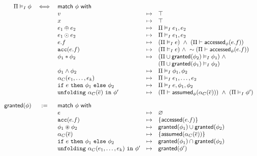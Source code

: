 \begin{align*}
\begin{array}{rclcl}
\Pi \frames \phi &\iff& \tsf{match} \ \phi \ \tsf{with} &&
\\
&& v &\mt&
  \top
\\
&& x &\mt&
  \top
\\
&& e_1 \oplus e_2 &\mt&
  \Pi \frames e_1, e_2
\\
&& e_1 \odot e_2 &\mt&
  \Pi \frames e_1, e_2
\\
&& e.f &\mt&
  (\Pi \frames e) \ \land \ (\Pi \entails \accessed_\phi(e.f))
\\
&& \cacc(e.f) &\mt&
  (\Pi \frames e)  \ \land \
  \pnot (\Pi \entails \accessed_\phi(e.f))
\\
&& \phi_1 \ast \phi_2 &\mt&
  (\Pi \cup \granted(\phi_2) \frames \phi_1) \ \land \\ &&&&
  (\Pi \cup \granted(\phi_1) \frames \phi_2)
\\
&& \phi_1 \land \phi_2 &\mt&
  \Pi \frames \phi_1, \phi_2
\\
&& \alpha_C(e_1, \dots, e_k) &\mt&
  \Pi \frames e_1, \dots, e_2
\\
&& \cif \ e \ \cthen \ \phi_1 \ \celse \ \phi_2 &\mt&
  \Pi \frames e, \phi_1, \phi_2
\\
&& \cunfolding \ \alpha_C(\vec{e}) \ \cin \ \phi\p &\mt&
  (\Pi \entails \assumed_\phi(\alpha_C(\vec{e}))) \ \land \
  (\Pi \frames \phi\p)
%
\\[1em]
%
\granted(\phi) &:=& \tsf{match} \ \phi \ \tsf{with} &&
\\
&& e &\mt&
  \empty
\\
&& \cacc(e.f) &\mt&
  \set{ \accessed(e.f) }
\\
&& \phi_1 \circast \phi_2 &\mt&
  \granted(\phi_1) \cup \granted(\phi_2)
\\
&& \alpha_C(\vec{e}) &\mt&
  \set{ \assumed(\alpha_C(\vec{e})) }
\\
&& \cif \ e \ \cthen \ \phi_1 \ \celse \ \phi_2 &\mt&
  \granted(\phi_1) \cap \granted(\phi_2)
\\
&& \cunfolding \ \alpha_C(e_1, \dots, e_k) \ \cin \ \phi\p &\mt&
  \granted(\phi\p)
\end{array}
\end{align*}


